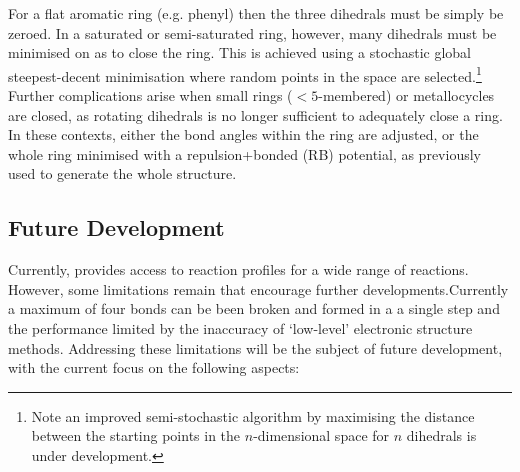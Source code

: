 \documentclass[../../main.tex]{subfiles}
\begin{document}
For a flat aromatic ring (e.g. phenyl) then the three dihedrals must be simply be zeroed. In a saturated or semi-saturated ring, however, many dihedrals must be minimised on as to close the ring. This is achieved using a stochastic global steepest-decent minimisation where random points in the space are selected.\footnote{Note an improved semi-stochastic algorithm by maximising the distance between the starting points in the $n$-dimensional space for $n$ dihedrals is under development.} Further complications arise when small rings ($< 5$-membered) or metallocycles are closed, as rotating dihedrals is no longer sufficient to adequately close a ring. In these contexts, either the bond angles within the ring are adjusted, or the whole ring minimised with a repulsion+bonded (RB) potential, as previously used to generate the whole structure.

\subsection{Future Development}

Currently, \ade provides access to reaction profiles for a wide range of reactions. However, some limitations remain that encourage further developments.Currently a maximum of four bonds can be been broken and formed in a a single step and the performance limited by the inaccuracy of `low-level’ electronic structure methods. Addressing these limitations will be the subject of future development, with the current focus on the following aspects:
 
\end{document}
